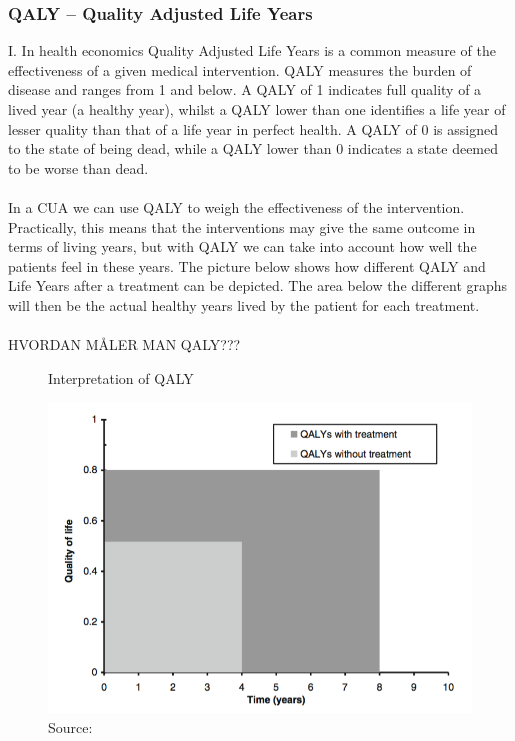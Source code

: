 \documentclass[a4paper,12pt]{article}
\begin{document}
\subsubsection*{QALY – Quality Adjusted Life Years}
I. In health economics Quality Adjusted Life Years is a common measure of the effectiveness of a given medical intervention. QALY measures the burden of disease and ranges from 1 and below. A QALY of 1 indicates full quality of a lived year (a healthy year), whilst a QALY lower than one identifies a life year of lesser quality than that of a life year in perfect health. A QALY of 0 is assigned to the state of being dead, while a QALY lower than 0 indicates a state deemed to be worse than dead.
\\\\
In a CUA we can use QALY to weigh the effectiveness of the intervention. Practically, this means that the interventions may give the same outcome in terms of living years, but with QALY we can take into account how well the patients feel in these years. The picture below shows how different QALY and Life Years after a treatment can be depicted. The area below the different graphs will then be the actual healthy years lived by the patient for each treatment. 
\\\\
HVORDAN MÅLER MAN QALY???
 
\begin{figure} [h]
	\centering
	\caption{Interpretation of QALY}
	\label{fig:qaly}
	\includegraphics[width=0.7\linewidth]{Pictures/QALY}
	\caption*{Source:  \cite{CUAbog} }
\end{figure}
\end{document}
